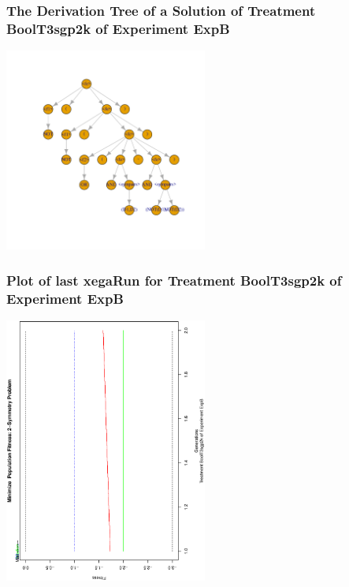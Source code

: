 \documentclass[18pt,c]{beamer}
\begin{document}
 \begin{frame}
 \frametitle{ The Derivation Tree of a Solution of Treatment BoolT3sgp2k of Experiment ExpB }
 \begin{center}
\includegraphics[width=0.5\textwidth, angle=0]
{ExpBDerivationTreeFigure015.pdf}
 \end{center}
 \label{report/ExpBDerivationTreeFigure015.pdf}  
 \end{frame}

 \begin{frame}
 \frametitle{ Plot of last xegaRun for Treatment BoolT3sgp2k of Experiment ExpB }
 \begin{center}
\includegraphics[width=0.5\textwidth, angle=-90]
{ExpBPlotPopStatsFigure015.eps}
 \end{center}
 \label{report/ExpBPlotPopStatsFigure015.eps}  
 \end{frame}
\end{document}
